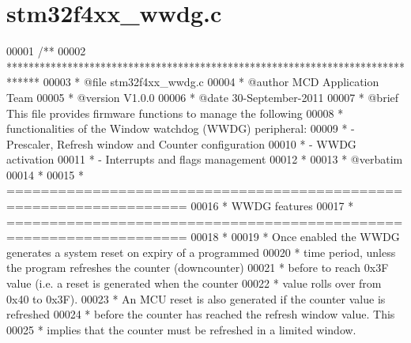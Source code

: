 \section{stm32f4xx\+\_\+wwdg.\+c}
\label{stm32f4xx__wwdg_8c_source}

\begin{DoxyCode}
00001 \textcolor{comment}{/**}
00002 \textcolor{comment}{  ******************************************************************************}
00003 \textcolor{comment}{  * @file    stm32f4xx\_wwdg.c}
00004 \textcolor{comment}{  * @author  MCD Application Team}
00005 \textcolor{comment}{  * @version V1.0.0}
00006 \textcolor{comment}{  * @date    30-September-2011}
00007 \textcolor{comment}{  * @brief   This file provides firmware functions to manage the following }
00008 \textcolor{comment}{  *          functionalities of the Window watchdog (WWDG) peripheral:           }
00009 \textcolor{comment}{  *           - Prescaler, Refresh window and Counter configuration}
00010 \textcolor{comment}{  *           - WWDG activation}
00011 \textcolor{comment}{  *           - Interrupts and flags management}
00012 \textcolor{comment}{  *             }
00013 \textcolor{comment}{  *  @verbatim}
00014 \textcolor{comment}{  *    }
00015 \textcolor{comment}{  *          ===================================================================}
00016 \textcolor{comment}{  *                                     WWDG features}
00017 \textcolor{comment}{  *          ===================================================================}
00018 \textcolor{comment}{  *                                        }
00019 \textcolor{comment}{  *          Once enabled the WWDG generates a system reset on expiry of a programmed}
00020 \textcolor{comment}{  *          time period, unless the program refreshes the counter (downcounter) }
00021 \textcolor{comment}{  *          before to reach 0x3F value (i.e. a reset is generated when the counter}
00022 \textcolor{comment}{  *          value rolls over from 0x40 to 0x3F). }
00023 \textcolor{comment}{  *          An MCU reset is also generated if the counter value is refreshed}
00024 \textcolor{comment}{  *          before the counter has reached the refresh window value. This }
00025 \textcolor{comment}{  *          implies that the counter must be refreshed in a limited window.}

\end{DoxyCode}
